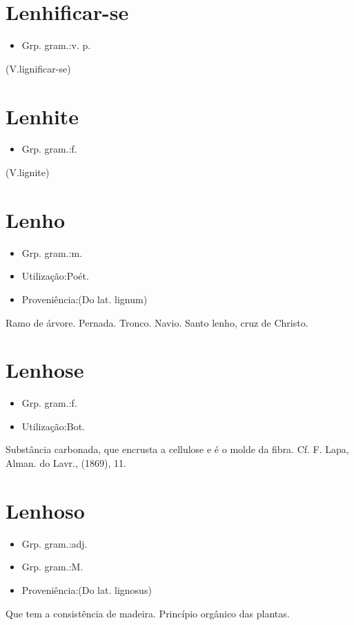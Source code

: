 \section{Lenhificar-se}
\begin{itemize}
\item {Grp. gram.:v. p.}
\end{itemize}
(V.lignificar-se)
\section{Lenhite}
\begin{itemize}
\item {Grp. gram.:f.}
\end{itemize}
(V.lignite)
\section{Lenho}
\begin{itemize}
\item {Grp. gram.:m.}
\end{itemize}
\begin{itemize}
\item {Utilização:Poét.}
\end{itemize}
\begin{itemize}
\item {Proveniência:(Do lat. \textunderscore lignum\textunderscore )}
\end{itemize}
Ramo de árvore.
Pernada.
Tronco.
Navio.
\textunderscore Santo lenho\textunderscore , cruz de Christo.
\section{Lenhose}
\begin{itemize}
\item {Grp. gram.:f.}
\end{itemize}
\begin{itemize}
\item {Utilização:Bot.}
\end{itemize}
Substância carbonada, que encrusta a cellulose e é o molde da fibra. Cf. F. Lapa, \textunderscore Alman. do Lavr.\textunderscore , (1869), 11.
\section{Lenhoso}
\begin{itemize}
\item {Grp. gram.:adj.}
\end{itemize}
\begin{itemize}
\item {Grp. gram.:M.}
\end{itemize}
\begin{itemize}
\item {Proveniência:(Do lat. \textunderscore lignosus\textunderscore )}
\end{itemize}
Que tem a consistência de madeira.
Princípio orgânico das plantas.
